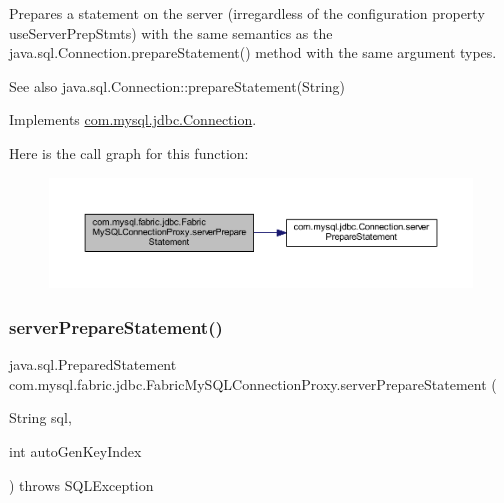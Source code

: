 Prepares a statement on the server (irregardless of the configuration property \textquotesingle{}use\+Server\+Prep\+Stmts\textquotesingle{}) with the same semantics as the java.\+sql.\+Connection.\+prepare\+Statement() method with the same argument types.

\begin{DoxySeeAlso}{See also}
java.\+sql.\+Connection\+::prepare\+Statement(\+String) 
\end{DoxySeeAlso}


Implements \mbox{\hyperlink{interfacecom_1_1mysql_1_1jdbc_1_1_connection_a6e2680bb0a1c38613a4788de1916b596}{com.\+mysql.\+jdbc.\+Connection}}.

Here is the call graph for this function\+:\nopagebreak
\begin{figure}[H]
\begin{center}
\leavevmode
\includegraphics[width=350pt]{classcom_1_1mysql_1_1fabric_1_1jdbc_1_1_fabric_my_s_q_l_connection_proxy_a1acde7226641989bf319992e99bc45f5_cgraph}
\end{center}
\end{figure}
\mbox{\label{classcom_1_1mysql_1_1fabric_1_1jdbc_1_1_fabric_my_s_q_l_connection_proxy_a6c9996b3e5be5aaab5f249429275a214}} 
\subsubsection{\texorpdfstring{server\+Prepare\+Statement()}{serverPrepareStatement()}\hspace{0.1cm}{\footnotesize\ttfamily [2/6]}}
{\footnotesize\ttfamily java.\+sql.\+Prepared\+Statement com.\+mysql.\+fabric.\+jdbc.\+Fabric\+My\+S\+Q\+L\+Connection\+Proxy.\+server\+Prepare\+Statement (\begin{DoxyParamCaption}\item[{String}]{sql,  }\item[{int}]{auto\+Gen\+Key\+Index }\end{DoxyParamCaption}) throws S\+Q\+L\+Exception}

